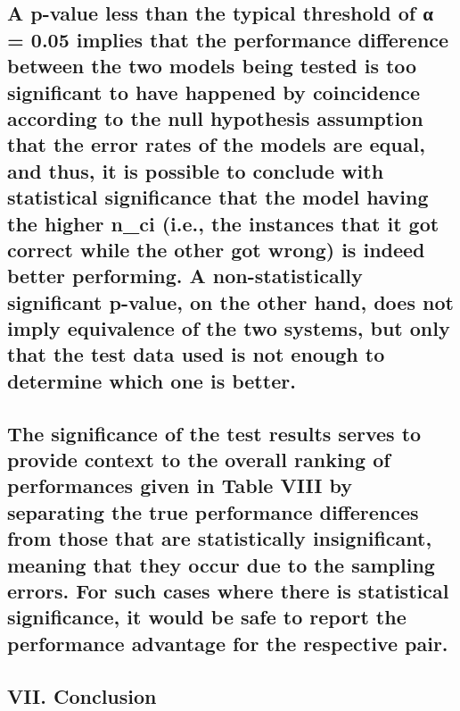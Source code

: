 \subsection{A p-value less than the typical threshold of α = 0.05
implies that the performance difference between the two models being
tested is too significant to have happened by coincidence according to
the null hypothesis assumption that the error rates of the models are
equal, and thus, it is possible to conclude with statistical
significance that the model having the higher n\_ci (i.e., the instances
that it got correct while the other got wrong) is indeed better
performing. A non-statistically significant p-value, on the other hand,
does not imply equivalence of the two systems, but only that the test
data used is not enough to determine which one is
better.}\label{a-p-value-less-than-the-typical-threshold-of-ux3b1-0.05-implies-that-the-performance-difference-between-the-two-models-being-tested-is-too-significant-to-have-happened-by-coincidence-according-to-the-null-hypothesis-assumption-that-the-error-rates-of-the-models-are-equal-and-thus-it-is-possible-to-conclude-with-statistical-significance-that-the-model-having-the-higher-n_ci-i.e.-the-instances-that-it-got-correct-while-the-other-got-wrong-is-indeed-better-performing.-a-non-statistically-significant-p-value-on-the-other-hand-does-not-imply-equivalence-of-the-two-systems-but-only-that-the-test-data-used-is-not-enough-to-determine-which-one-is-better.}

\subsection{The significance of the test results serves to provide
context to the overall ranking of performances given in Table VIII by
separating the true performance differences from those that are
statistically insignificant, meaning that they occur due to the sampling
errors. For such cases where there is statistical significance, it would
be safe to report the performance advantage for the respective
pair.}\label{the-significance-of-the-test-results-serves-to-provide-context-to-the-overall-ranking-of-performances-given-in-table-viii-by-separating-the-true-performance-differences-from-those-that-are-statistically-insignificant-meaning-that-they-occur-due-to-the-sampling-errors.-for-such-cases-where-there-is-statistical-significance-it-would-be-safe-to-report-the-performance-advantage-for-the-respective-pair.}

\subsection{VII. Conclusion}\label{vii.-conclusion}

